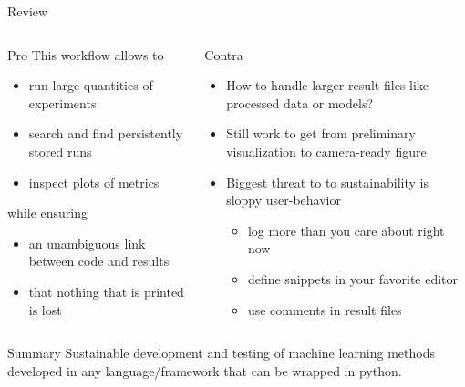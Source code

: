 \documentclass[aspectratio=169,10pt]{beamer}
\begin{document}
\begin{frame}[t,fragile]{Review}
\begin{columns}[T]
    \begin{column}{.5\textwidth}
        \begin{alertblock}{Pro}
            This workflow allows to
            \vspace{-2mm}
            \begin{itemize}
                \item run large quantities of experiments
                \item search and find persistently stored runs
                \item inspect plots of metrics
            \end{itemize}
            while ensuring
            \vspace{-2mm}
            \begin{itemize}
                \item an unambiguous link between code and results
                \item that nothing that is printed is lost
            \end{itemize}   
        \end{alertblock}
    \end{column}
    
    \begin{column}{.5\textwidth}    
        \begin{block}{Contra}
            \begin{itemize}
                \item How to handle larger result-files like processed data or models?
                \item Still work to get from preliminary visualization to camera-ready figure
                \item Biggest threat to to sustainability is sloppy user-behavior
                \begin{itemize}
                    \item log more than you care about right now
                    \item define snippets in your favorite editor
                    \item use comments in result files
                \end{itemize}
            \end{itemize}
        \end{block}
    \end{column}
    
\end{columns}
\pause
{}
\begin{block}{Summary}
     Sustainable development and testing of machine learning methods developed in any language/framework that can be wrapped in python.
\end{block}
               



\end{frame}
\end{document}
